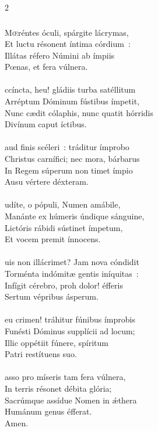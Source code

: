 \documentclass[9pt,twoside]{extarticle}
\begin{document}
\begin{multicols}{2}
{{{\subsubsection*{\center {}}
\lettrine{M}œréntes óculi, spárgite lácrymas,\\
Et luctu résonent íntima córdium~:\\
Illátas réfero Númini ab ímpiis\\
Pœnas, et fera vúlnera.\\
\\
ccíncta, heu! gládiis turba satéllitum\\
Arréptum Dóminum fústibus ímpetit,\\
Nunc cædit cólaphis, nunc quatit hórridis\\
Divínum caput íctibus.\\
\\
aud finis scéleri~: tráditur ímprobo\\
Christus carnífici; nec mora, bárbarus\\
In Regem súperum non timet ímpio\\
Ausu vértere déxteram.\\
\\
udíte, o pópuli, Numen amábile,\\
Manánte ex húmeris úndique sánguine,\\
Lictóris rábidi sústinet ímpetum,\\
Et vocem premit ínnocens.\\
\\
uis non illácrimet? Jam nova cóndidit\\
Torménta indómitæ gentis iníquitas~:\\
Infígit cérebro, proh dolor! éfferis\\
Sertum vépribus ásperum.\\
\\
eu crimen! tráhitur fúnibus ímprobis\\
Funésti Dóminus supplícii ad locum;\\
Illic oppétiit fúnere, spíritum\\
Patri restítuens suo.\\
\\
asso pro míseris tam fera vúlnera,\\
In terris résonet débita glória;\\
Sacrúmque assídue Nomen in ǽthera\\
Humánum genus éfferat.\\
Amen.

}}}
\end{multicols}
\end{document}
